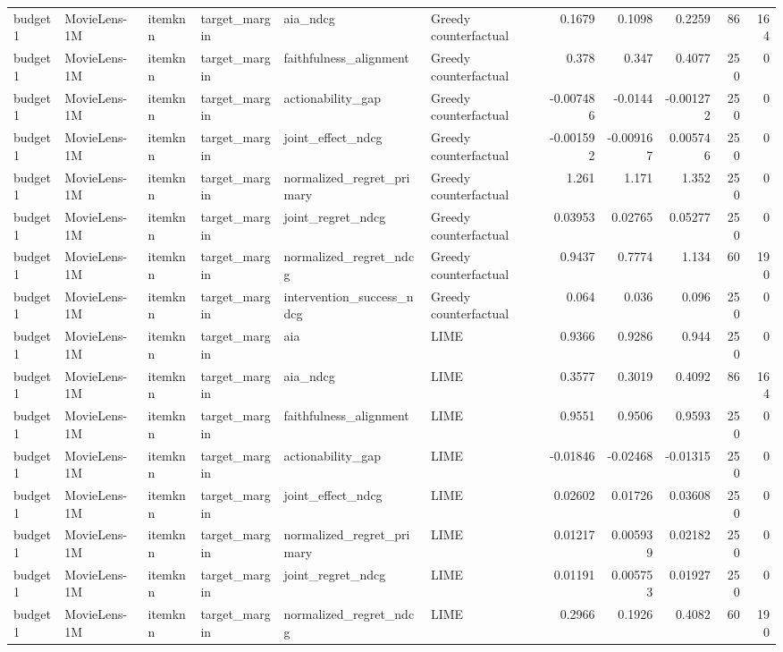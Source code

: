 \begin{table}[t]
{\begin{tabular}{llllllrrrrr}
budget1 & MovieLens-1M & itemknn & target\_margin & aia\_ndcg & Greedy counterfactual & 0.1679 & 0.1098 & 0.2259 & 86 & 164 \\
budget1 & MovieLens-1M & itemknn & target\_margin & faithfulness\_alignment & Greedy counterfactual & 0.378 & 0.347 & 0.4077 & 250 & 0 \\
budget1 & MovieLens-1M & itemknn & target\_margin & actionability\_gap & Greedy counterfactual & -0.007486 & -0.0144 & -0.001272 & 250 & 0 \\
budget1 & MovieLens-1M & itemknn & target\_margin & joint\_effect\_ndcg & Greedy counterfactual & -0.001592 & -0.009167 & 0.005746 & 250 & 0 \\
budget1 & MovieLens-1M & itemknn & target\_margin & normalized\_regret\_primary & Greedy counterfactual & 1.261 & 1.171 & 1.352 & 250 & 0 \\
budget1 & MovieLens-1M & itemknn & target\_margin & joint\_regret\_ndcg & Greedy counterfactual & 0.03953 & 0.02765 & 0.05277 & 250 & 0 \\
budget1 & MovieLens-1M & itemknn & target\_margin & normalized\_regret\_ndcg & Greedy counterfactual & 0.9437 & 0.7774 & 1.134 & 60 & 190 \\
budget1 & MovieLens-1M & itemknn & target\_margin & intervention\_success\_ndcg & Greedy counterfactual & 0.064 & 0.036 & 0.096 & 250 & 0 \\
budget1 & MovieLens-1M & itemknn & target\_margin & aia & LIME & 0.9366 & 0.9286 & 0.944 & 250 & 0 \\
budget1 & MovieLens-1M & itemknn & target\_margin & aia\_ndcg & LIME & 0.3577 & 0.3019 & 0.4092 & 86 & 164 \\
budget1 & MovieLens-1M & itemknn & target\_margin & faithfulness\_alignment & LIME & 0.9551 & 0.9506 & 0.9593 & 250 & 0 \\
budget1 & MovieLens-1M & itemknn & target\_margin & actionability\_gap & LIME & -0.01846 & -0.02468 & -0.01315 & 250 & 0 \\
budget1 & MovieLens-1M & itemknn & target\_margin & joint\_effect\_ndcg & LIME & 0.02602 & 0.01726 & 0.03608 & 250 & 0 \\
budget1 & MovieLens-1M & itemknn & target\_margin & normalized\_regret\_primary & LIME & 0.01217 & 0.005939 & 0.02182 & 250 & 0 \\
budget1 & MovieLens-1M & itemknn & target\_margin & joint\_regret\_ndcg & LIME & 0.01191 & 0.005753 & 0.01927 & 250 & 0 \\
budget1 & MovieLens-1M & itemknn & target\_margin & normalized\_regret\_ndcg & LIME & 0.2966 & 0.1926 & 0.4082 & 60 & 190 \\

\end{tabular}}
\end{table}
